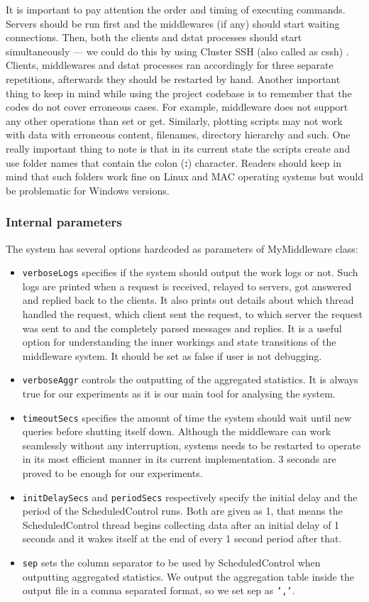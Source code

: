 \documentclass[11pt,a4paper]{article}
\begin{document}
\par It is important to pay attention the order and timing of executing commands. Servers should be run first and the middlewares (if any) should start waiting connections. Then, both the clients and dstat processes should start simultaneously — we could do this by using Cluster SSH (also called as cssh) \cite{cssh}. Clients, middlewares and dstat processes ran accordingly for three separate repetitions, afterwards they should be restarted by hand. Another important thing to keep in mind while using the project codebase is to remember that the codes do not cover erroneous cases. For example, middleware does not support any other operations than set or get. Similarly, plotting scripts may not work with data with erroneous content, filenames, directory hierarchy and such. One really important thing to note is that in its current state the scripts create and use folder names that contain the colon (\textbf{:}) character. Readers should keep in mind that such folders work fine on Linux and MAC operating systems but would be problematic for Windows versions.

\subsubsection*{Internal parameters} \label{sec:app-internalparameters}
The system has several options hardcoded as parameters of MyMiddleware class:
\begin{itemize}
\item \texttt{verboseLogs} specifies if the system should output the work logs or not. Such logs are printed when a request is received, relayed to servers, got answered and replied back to the clients. It also prints out details about which thread handled the request, which client sent the request, to which server the request was sent to and the completely parsed messages and replies. It is a useful option for understanding the inner workings and state transitions of the middleware system. It should be set as false if user is not debugging.
\item \texttt{verboseAggr} controls the outputting of the aggregated statistics. It is always true for our experiments as it is our main tool for analysing the system.
\item \texttt{timeoutSecs} specifies the amount of time the system should wait until new queries before shutting itself down. Although the middleware can work seamlessly without any interruption, systems needs to be restarted to operate in its most efficient manner in its current implementation. 3 seconds are proved to be enough for our experiments.
\item \texttt{initDelaySecs} and \texttt{periodSecs} respectively specify the initial delay and the period of the ScheduledControl runs. Both are given as 1, that means the ScheduledControl thread begins collecting data after an initial delay of 1 seconds and it wakes itself at the end of every 1 second period after that.
\item \texttt{sep} sets the column separator to be used by ScheduledControl when outputting aggregated statistics. We output the aggregation table inside the output file in a comma separated format, so we set sep as \texttt{','}.
\end{itemize}
\end{document}
